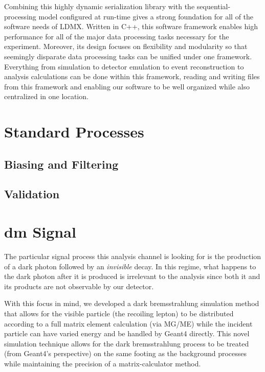 Combining this highly dynamic serialization library with the sequential-processing model configured at run-time gives a strong foundation for all of the software needs of LDMX. Written in C++, this software framework enables high performance for all of the major data processing tasks necessary for the experiment. Moreover, its design focuses on flexibility and modularity so that seemingly disparate data processing tasks can be unified under one framework. Everything from simulation to detector emulation to event reconstruction to analysis calculations can be done within this framework, reading and writing files from this framework and enabling our software to be well organized while also centralized in one location.

\section{Standard Processes}

\subsection{Biasing and Filtering}

\subsection{Validation}

\section{\gls{dm} Signal}
The particular signal process this analysis channel is looking for is the
production of a dark photon followed by an \emph{invisible} decay. In this
regime, what happens to the dark photon after it is produced is irrelevant
to the analysis since both it and its products are not observable by our
detector.

With this focus in mind, we developed a dark bremsstrahlung simulation method
that allows for the visible particle (the recoiling lepton) to be distributed
according to a full matrix element calculation (via MG/ME) while the incident
particle can have varied energy and be handled by Geant4 directly. This novel
simulation technique allows for the dark bremsstrahlung process to be treated
(from Geant4's perspective) on the same footing as the background processes
while maintaining the precision of a matrix-calculator method.

